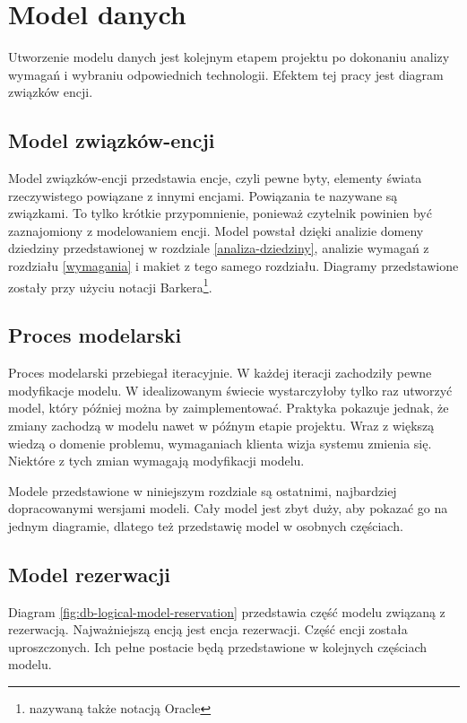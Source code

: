 \documentclass[a4paper,onecolumn,oneside,11pt,wide,floatssmall]{mwrep}
\theoremstyle{definition}
\theoremstyle{plain}%
\theoremstyle{remark}
\begin{document}
\chapter{Model danych}
Utworzenie modelu danych jest kolejnym etapem projektu po dokonaniu analizy wymagań i wybraniu odpowiednich technologii. Efektem tej pracy jest diagram związków encji.

\section{Model związków-encji}
Model związków-encji przedstawia encje, czyli pewne byty, elementy świata rzeczywistego powiązane z innymi encjami. Powiązania te nazywane są związkami. To tylko krótkie przypomnienie, ponieważ czytelnik powinien być zaznajomiony z modelowaniem encji. 
Model powstał dzięki analizie domeny dziedziny przedstawionej w rozdziale \ref{analiza-dziedziny}, analizie wymagań z rozdziału \ref{wymagania} i makiet z tego samego rozdziału. Diagramy przedstawione zostały przy użyciu notacji Barkera\footnote{nazywaną także notacją Oracle}.

\section{Proces modelarski}
Proces modelarski przebiegał iteracyjnie. W każdej iteracji zachodziły pewne modyfikacje modelu. W idealizowanym świecie wystarczyłoby tylko raz utworzyć model, który później można by zaimplementować. Praktyka pokazuje jednak, że zmiany zachodzą w modelu nawet w późnym etapie projektu. Wraz z większą wiedzą o domenie problemu, wymaganiach klienta wizja systemu zmienia się. Niektóre z tych zmian wymagają modyfikacji modelu. 

Modele przedstawione w niniejszym rozdziale są ostatnimi, najbardziej dopracowanymi wersjami modeli. Cały model jest zbyt duży, aby pokazać go na jednym diagramie, dlatego też przedstawię model w osobnych częściach.

\section{Model rezerwacji}
Diagram \ref{fig:db-logical-model-reservation} przedstawia część modelu związaną z rezerwacją. Najważniejszą encją jest encja rezerwacji. Część encji została uproszczonych. Ich pełne postacie będą przedstawione w kolejnych częściach modelu.
\end{document}
